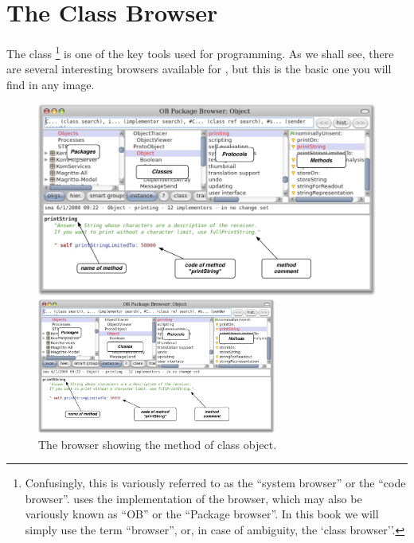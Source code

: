 \documentclass[a4paper,10pt,twoside]{book}
\begin{document}
\section{The Class Browser}

The class \footnote{Confusingly, this is variously referred to as the ``system browser'' or the ``code browser''. \pharo uses the  implementation of the browser, which may also be variously known as ``OB'' or the ``Package browser''.
In this book we will simply use the term ``browser'', or, in case of ambiguity, the `class browser''.} is one of the key tools used for programming.
As we shall see, there are several interesting browsers available for \pharo, but this is the basic one you will find in any image.


\begin{figure}[htb]
\ifluluelse
	{\centerline {\includegraphics[width=\textwidth]{ClassBrowser1}}}
	{\centerline {\includegraphics[width=0.7\textwidth]{ClassBrowser1}}}
\caption{The browser showing the  method of class object.
\label{fig:classBrowser}}
\end{figure}
\end{document}
